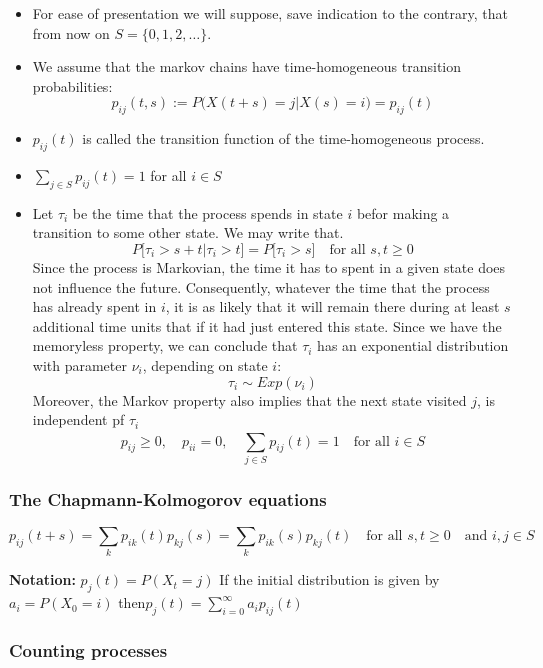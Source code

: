 \begin{itemize}
	\item For ease of presentation we will suppose, save indication to the contrary, that from now on $S=\{0,1,2,\ldots\}$.
	\item We assume that the markov chains have time-homogeneous transition probabilities: $$p_{ij}(t,s):=P\big(X(t+s)=j|X(s)=i\big)=p_{ij}(t)$$
	\item $p_{ij}(t)$ is called the transition function of the time-homogeneous process.
	\item $\sum\limits_{j\in S}^{}{p_{ij}(t)=1}$ for all $i \in S$
	\item Let $\tau_i$ be the time that the process spends in state $i$ befor making a transition to some other state. We may write that.
	$$P\big[\tau_i>s+t\big|\tau_i>t\big]=P\big[\tau_i>s\big] \quad\text{for all } s,t\geq 0$$
	Since the process is Markovian, the time it has to spent in a given state does not influence the future. Consequently, whatever the time that the process has already spent in $i$, it is as likely that it will remain there during at least $s$ additional time units that if it had just entered this state. Since we have the memoryless property, we can conclude that $\tau_i$ has an exponential distribution with parameter $\nu_i$, depending on state $i$:
	$$\tau_i\sim Exp(\nu_i)$$
	Moreover, the Markov property also implies that the next state visited $j$, is independent pf $\tau_i$
	$$p_{ij}\geq 0, \quad p_{ii}=0, \quad \sum\limits_{j\in S}^{}{p_{ij}(t)}=1\quad \text{for all } i \in S$$
	
\end{itemize}

\subsubsection{The  Chapmann-Kolmogorov equations }

$$p_{ij}(t+s)=\sum\limits_k{p_{ik}(t)p_{kj}(s)}=\sum\limits_k{p_{ik}(s)p_{kj}(t)}\quad\text{for all } s,t\geq 0 \quad\text{and } i,j\in S$$

\textbf{Notation:} $p_j(t)=P(X_t=j)$ \qquad If the initial distribution is given by $a_i=P(X_0=i)$ then\quad $p_j(t)=\sum\limits_{i=0}^{\infty}{a_i p_{ij}(t)}$


\subsubsection{Counting processes }

